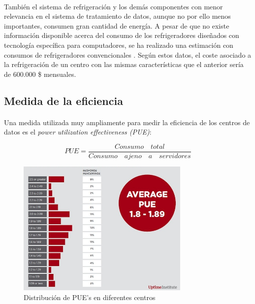 \documentclass[12pt]{article}
\begin{document}
            \paragraph{}
            También el sistema de refrigeración y los demás componentes con menor relevancia en el sistema de tratamiento de datos, aunque no por ello menos importantes, consumen gran cantidad de energía. A pesar de que no existe información disponible acerca del consumo de los refrigeradores diseñados con tecnología específica para computadores, se ha realizado una estimación con consumos de refrigeradores convencionales \cite{wikipedia:consumo}. Según estos datos, el coste asociado a la refrigeración de un centro con las mismas características que el anterior sería de 600.000 \$ mensuales.
            
       \subsection{Medida de la eficiencia}
       		\paragraph{}
            Una medida utilizada muy ampliamente para medir la eficiencia de los centros de datos es el \textit{power utilization effectiveness (PUE)}:
            
            \begin{displaymath}
            	PUE = \frac{Consumo \quad total}{Consumo \quad ajeno\quad a \quad servidores}
            \end{displaymath}
            
           	\begin{figure}[htpb!]
				\begin{center}
					\includegraphics[width=0.75\textwidth]{pue}
					\caption{Distribución de PUE's en diferentes centros}
					\label{image:pue}
				\end{center}
			\end{figure}
            
\end{document}
